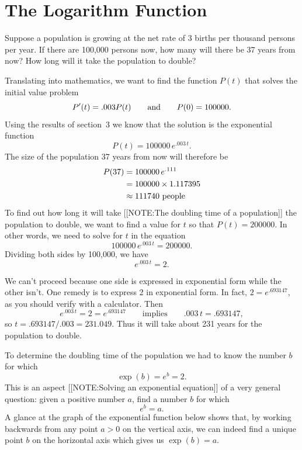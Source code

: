 \section{The Logarithm Function}
\label{sec:the-logarithm-function}

Suppose a population is growing at the net rate of 3 births per
thousand persons per year.  If there are 100,000 persons now, how many
will there be 37 years from now?  How long will it take the population
to double?

Translating into mathematics, we want to find the function $P(t)$ that
solves the initial value problem
	\[
P'(t) = .003P(t) \qquad \hbox{and} \qquad 
		P(0) = 100000.
\] 
Using the results of section~3 we know that the solution is the exponential
function
	\[
P(t) = 100000\,e^{.003\,t}.
\] 
The size of the population 37 years from now will therefore be 
\begin{align*}
	P(37) & =  100000\,e^{.111} \\
	      & =  100000 \times  1.117395 \\
	      & \approx  111740 \hbox{ people}
\end{align*}
To find out how long it will take 
[[NOTE:The doubling time  of a population]]
the population to double, we want to find a value
for $t$ so that $P(t) = 200000$.  In other words, we need to solve for
$t$ in the equation
	\[
100000\,e^{.003\,t} = 200000.
\]
Dividing both sides by 100,000, we have
	\[
e^{.003\,t} = 2.
\]

We can't proceed because one side is expressed in exponential form
while the other isn't.  One remedy is to express 2 in exponential
form.  In fact, $2 = e^{.693147}$, as you should verify with a
calculator.  Then
	\[
e^{.003\,t} = 2 = e^{.693147}
	 \qquad \mbox{implies} \qquad .003\,t = .693147,
\]
so $t = .693147/.003 = 231.049$.  Thus it will take about 231 years
for the population to double.




To determine the doubling time of the population we had to know the
number $b$ for which
	\[
\exp(b) = e^{\displaystyle b} = 2.
\]
This is an aspect 
[[NOTE:Solving an  exponential equation]]
of a very general question: given a positive number $a$, find a number
$b$ for which
	\[
e^{\displaystyle b} = a.
\]
A glance at the graph of the exponential function below shows that, by
working backwards from any point $a>0$ on the vertical axis, we can
indeed find a unique point $b$ on the horizontal axis which gives us
$\exp(b) = a$.

